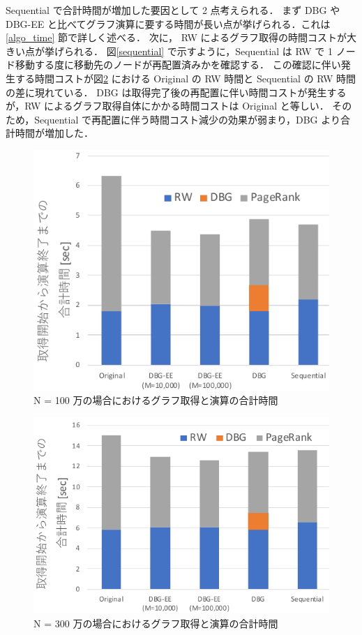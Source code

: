 Sequential で合計時間が増加した要因として 2 点考えられる．
まず DBG や DBG-EE と比べてグラフ演算に要する時間が長い点が挙げられる．これは\ref{algo_time} 節で詳しく述べる．
次に， RW によるグラフ取得の時間コストが大きい点が挙げられる．
図\ref{sequential} で示すように，Sequential は RW で 1 ノード移動する度に移動先のノードが再配置済みかを確認する．
この確認に伴い発生する時間コストが図\ref{total_time_3000000} における Original の RW 時間と Sequential の RW 時間の差に現れている．
DBG は取得完了後の再配置に伴い時間コストが発生するが，RW によるグラフ取得自体にかかる時間コストは Original と等しい．
そのため，Sequential で再配置に伴う時間コスト減少の効果が弱まり，DBG より合計時間が増加した．
\begin{figure}[t]
  \centering
  \includegraphics[width=0.8\linewidth]{./figure/total_time_1000000.pdf}
  \caption{N = 100 万の場合におけるグラフ取得と演算の合計時間}
  \label{total_time_1000000}
\end{figure}
\begin{figure}[t]
  \centering
  \includegraphics[width=0.8\linewidth]{./figure/total_time_3000000.pdf}
  \caption{N = 300 万の場合におけるグラフ取得と演算の合計時間}
  \label{total_time_3000000}
\end{figure}

